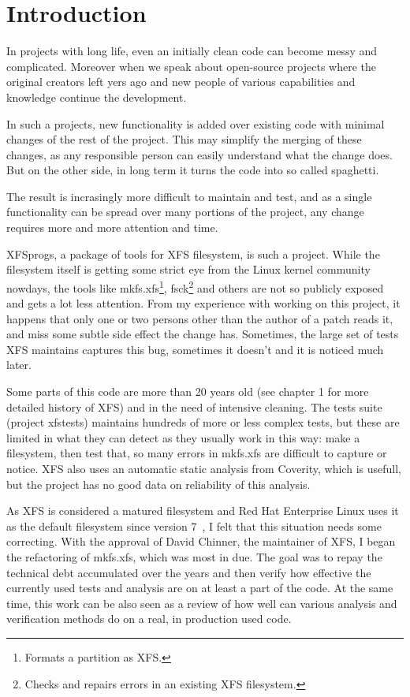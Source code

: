
\chapter{Introduction}

In projects with long life, even an initially clean code can become messy and complicated. Moreover when we speak about open-source projects where the original creators left yers ago and new people of various capabilities and knowledge continue the development.

In such a projects, new functionality is added over existing code with minimal changes of the rest of the project. This may simplify the merging of these changes, as any responsible person can easily understand what the change does. But on the other side, in long term it turns the code into so called spaghetti.

The result is incrasingly more difficult to maintain and test, and as a single functionality can be spread over many portions of the project, any change requires more and more attention and time.

XFSprogs, a package of tools for XFS filesystem, is such a project. While the filesystem itself is getting some strict eye from the Linux kernel community nowdays, the tools like mkfs.xfs\footnote{Formats a partition as XFS.}, fsck\footnote{Checks and repairs errors in an existing XFS filesystem.} and others are not so publicly exposed and gets a lot less attention. From my experience with working on this project, it happens that only one or two persons other than the author of a patch reads it, and miss some subtle side effect the change has. Sometimes, the large set of tests XFS maintains captures this bug, sometimes it doesn't and it is noticed much later.

Some parts of this code are more than 20 years old (see chapter 1 for more detailed history of XFS) and in the need of intensive cleaning. The tests suite (project xfstests) maintains hundreds of more or less complex tests, but these are limited in what they can detect as they usually work in this way: make a filesystem, then test that, so many errors in mkfs.xfs are difficult to capture or notice. XFS also uses an automatic static analysis from Coverity, which is usefull, but the project has no good data on reliability of this analysis.

As XFS is considered a matured filesystem and Red Hat Enterprise Linux uses it as the default filesystem since version 7~\cite{RHEL7XFS}, I felt that this situation needs some correcting. With the approval of David Chinner, the maintainer of XFS, I began the refactoring of mkfs.xfs, which was most in due. The goal was to repay the technical debt accumulated over the years and then verify how effective the currently used tests and analysis are on at least a part of the code. At the same time, this work can be also seen as a review of how well can various analysis and verification methods do on a real, in production used code.


